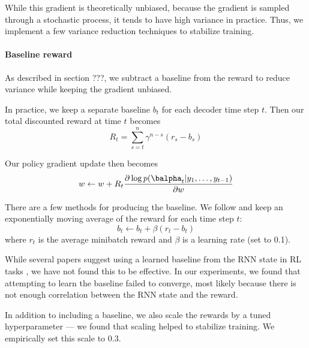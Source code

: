 \documentclass[11pt]{report}
\begin{document}
While this gradient is theoretically unbiased, because the gradient is sampled through a stochastic process, it tends to have high variance in practice. Thus, we implement a few variance reduction techniques to stabilize training.

\paragraph{Baseline reward} As described in section ???, we subtract a baseline from the reward to reduce variance while keeping the gradient unbiased.

In practice, we keep a separate baseline $b_t$ for each decoder time step $t$. Then our total discounted reward at time $t$ becomes
\begin{equation}
R_t = \sum_{s=t}^n \gamma^{n-s}(r_s - b_s)
\end{equation}

Our policy gradient update then becomes
\begin{equation}
w \gets w + R_t \frac{\partial \log p(\balpha_t | y_1, \ldots, y_{t-1})}{\partial w}
\end{equation}

There are a few methods for producing the baseline. We follow \citet{xu2015captioning} and keep an exponentially moving average of the reward for each time step $t$:
\begin{equation}
b_t \gets b_t + \beta (r_t - b_t)
\end{equation}
where $r_t$ is the average minibatch reward and $\beta$ is a learning rate (set to 0.1).


While several papers suggest using a learned baseline from the RNN state in RL tasks  \citep[e.g.][]{mnih2014visualattention, ranzato2015}, we have not found this to be effective. In our experiments, we found that attempting to learn the baseline failed to converge, most likely because there is not enough correlation between the RNN state and the reward.


In addition to including a baseline, we also scale the rewards by a tuned hyperparameter --- we found that scaling helped to stabilize training. We empirically set this scale to 0.3.
\end{document}
